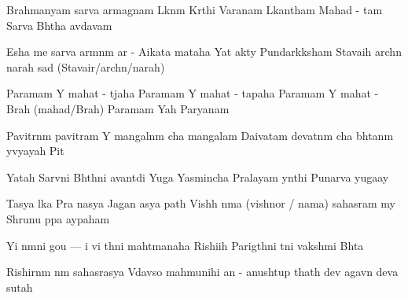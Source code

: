 \documentclass[20pt]{article}
\begin{document}
\SlokaHuge
{Brahmanyam sarva {\Dh}armagnam} {L{\oh}k{\A}n{\A}m K{\ee}rthi Var{\dhh}anam}
{L{\oh}kan{\A}tham Mahad - {\bh} {\oo}tam} {Sarva Bh{\oo}tha {\bh}av{\oh}d{\bh}avam}

\SlokaHuge
{Esha me sarva {\Dh}arm{\A}n{\A}m} {{\Dh}ar{\mo} - A{\dhh}ikata{\mo} mataha}
{Yat \dsh {\bh}akty{\A} Pundar{\ee}k{\A}ksham} {Stavaih arch{\e}n narah sad{\A} (Stavair/arch{\e}n/narah)}

\novspace
\SlokaHuge
{Paramam Y{\oh} mahat - t{\e}jaha} {Paramam Y{\oh} mahat - tapaha}
{Paramam Y{\oh} mahat - Brah{\ma} (mahad/Brah{\ma})} {Paramam Yah Par{\A}yanam}

\SlokaHuge
{Pavitr{\A}n{\A}m pavitram Y{\oh}} {mangal{\A}n{\A}m cha mangalam}
{Daivatam devat{\A}n{\A}m cha} {bh{\oo}tan{\A}m y{\oh}vyayah Pit{\A}}

\SlokaHuge
{Yatah Sarv{\A}ni Bh{\oo}th{\A}ni} {{\Bh}avant{\ya}di Yu{\ga}ga{\me}}
{Yasmin{\sh}cha Pralayam y{\A}nthi} {Punar{\e}va yuga{\ksh}ay{\e}}

\SlokaHuge
{Tasya l{\oh}ka Pra{\dhh} {\A}nasya} {Jagan{\na} {\Th}asya {\Bh} {\oo}path{\e}}
{Vish{\no}h \dsh n{\A}ma (vishnor / nama) sahasram m{\e}y} {Shrunu p{\A}pa {\Bh}ay{\A}paham}

\novspace
\SlokaHuge
{Y{\an}i n{\A}m{\A}ni gou {---} {\N}i} {vi{\kh} {\ya}th{\A}ni mah{\A}tmanaha}
{Rishi{\bh}ih Parig{\ee}th{\A}ni} {t{\ha}ni vaksh{\ya}mi Bh{\oo}ta{\ye}}

\SlokaHuge
{Rishirn{\A}m n{\A}m sahasrasya} {V{\e}dav{\ya}so mah{\A}munihi}
{{\ch}an{\dO} - anushtup thath{\A} dev{\oh}} {{\Bh}agav{\A}n deva{\ki} sutah}



\end{document}
